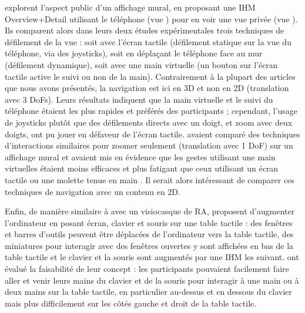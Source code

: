 

\cite{Berge2014} explorent l'aspect public d'un affichage mural, en proposant une IHM Overview+Detail utilisant le téléphone (vue ) pour en voir une vue privée (vue ). Ils comparent alors dans leurs deux études expérimentales trois techniques de défilement de la vue   : soit avec l'écran tactile (défilement statique sur la vue du téléphone, via des joysticks), soit en déplaçant le téléphone face au mur (défilement dynamique), soit avec une main virtuelle (un bouton sur l'écran tactile active le suivi ou non de la main). Contrairement à la plupart des articles que nous avons présentés, la navigation est ici en 3D et non en 2D (translation avec 3 DoFs). Leurs résultats indiquent que la main virtuelle et le suivi du téléphone étaient les plus rapides et préférés des participants ; cependant, l'usage de joysticks plutôt que des défilements directs avec un doigt, et zoom avec deux doigts, ont pu jouer en défaveur de l'écran tactile. \cite{Nancel2011} avaient comparé des techniques d'interactions similaires pour zoomer seulement (translation avec 1 DoF) sur un affichage mural et avaient mis en évidence que les gestes utilisant une main virtuelles étaient moins efficaces et plus fatigant que ceux utilisant un écran tactile ou une molette tenue en main . Il serait alors intéressant de comparer ces techniques de navigation avec un contenu en 2D.


Enfin, de manière similaire à \cite{Serrano2015} avec un visiocasque de RA, \cite{Bi2011} proposent d'augmenter l'ordinateur en posant écran, clavier et souris sur une table tactile  : des fenêtres et barres d'outils peuvent être déplacées de l'ordinateur vers la table tactile, des miniatures pour interagir avec des fenêtres ouvertes y sont affichées en bas de la table tactile et le clavier et la souris sont augmentés par une IHM les suivant. \citeauthor{Bi2011} ont évalué la faisabilité de leur concept : les participants pouvaient facilement faire aller et venir leurs mains du clavier et de la souris pour interagir à une main ou à deux mains sur la table tactile, en particulier au-dessus et en dessous du clavier mais plus difficilement sur les côtés gauche et droit de la table tactile.


